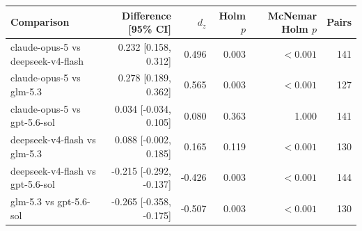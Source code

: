 \begin{tabular}{lrrrrr}
\toprule
Comparison & Difference [95\% CI] & $d_z$ & Holm $p$ & McNemar Holm $p$ & Pairs \\
\midrule
claude-opus-5 vs deepseek-v4-flash & 0.232 [0.158, 0.312] & 0.496 & 0.003 & $<0.001$ & 141 \\
claude-opus-5 vs glm-5.3 & 0.278 [0.189, 0.362] & 0.565 & 0.003 & $<0.001$ & 127 \\
claude-opus-5 vs gpt-5.6-sol & 0.034 [-0.034, 0.105] & 0.080 & 0.363 & 1.000 & 141 \\
deepseek-v4-flash vs glm-5.3 & 0.088 [-0.002, 0.185] & 0.165 & 0.119 & $<0.001$ & 130 \\
deepseek-v4-flash vs gpt-5.6-sol & -0.215 [-0.292, -0.137] & -0.426 & 0.003 & $<0.001$ & 144 \\
glm-5.3 vs gpt-5.6-sol & -0.265 [-0.358, -0.175] & -0.507 & 0.003 & $<0.001$ & 130 \\
\bottomrule
\end{tabular}
